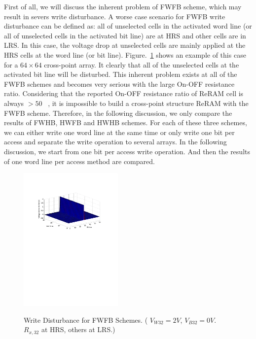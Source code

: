 First of all, we will discuss the inherent problem of FWFB scheme, which
may result in severs write disturbance. A worse case scenario for FWFB
write disturbance can be defined as: all of unselected cells in the
activated word line (or all of unselected cells in the activated bit line)
are at HRS and other cells are in LRS. In this case, the voltage drop at
unselected cells are mainly applied at the HRS cells at the word line (or
bit line). Figure.~\ref{fig:FWFR} shows an example of this case for a $64
\times 64$ cross-point array. It clearly that all of the unselected cells
at the activated bit line will be disturbed. This inherent problem exists
at all of the FWFB schemes and becomes very serious with the large On-OFF
resistance ratio. Considering that the reported On-OFF resistance ratio of
ReRAM cell is always $>50$
~\cite{ReRAM_IEDM2010_Ho,ReRAM_IEDM2010_Chien,ReRAM_IEDM2010_Lee_Diode,ReRAM_IEDM2010_Lee_Evidence,ReRAM_ISSCC2011_Sheu,ReRAM_ISSCC2011_Otsuka},
it is impossible to build a cross-point structure ReRAM with the FWFB
scheme. Therefore, in the following discussion, we only compare the
results of FWHB, HWFB and HWHB schemes. For each of these three schemes,
we can either write one word line at the same time or only write one bit
per access and separate the write operation to several arrays. In the
following discussion, we start from one bit per access write operation.
And then the results of one word line per access method are compared.

\begin{figure}%
\centering
  \includegraphics[width=0.45\textwidth]{./figures/FWFB2.pdf}\\
  \caption{Write Disturbance for FWFB Schemes. ( $V_{W32} = 2V$, $V_{B32} = 0V$. $R_{x,32}$ at HRS, others at LRS.) }\label{fig:FWFR}
\end{figure}

